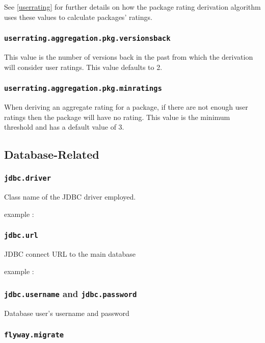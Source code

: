 See \ref{userrating} for further details on how the package rating derivation algorithm uses these values to calculate packages' ratings.

\subsubsection{\tt userrating.aggregation.pkg.versionsback}

This value is the number of versions back in the past from which the derivation will consider user ratings.  This value defaults to 2.

\subsubsection{\tt userrating.aggregation.pkg.minratings}

When deriving an aggregate rating for a package, if there are not enough user ratings then the package will have no rating.  This value is the minimum threshold and has a default value of 3.

\subsection{Database-Related}

\subsubsection{\tt jdbc.driver}

Class name of the JDBC driver employed.

example : 

\subsubsection{\tt jdbc.url}

JDBC connect URL to the main database

example : 

\subsubsection{{\tt jdbc.username} and {\tt jdbc.password}}

Database user's username and password

\subsubsection{\tt flyway.migrate}

